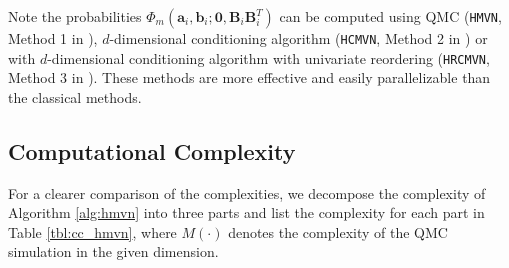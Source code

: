 Note the probabilities $\Phi_m(\mathbf{a}_i, \mathbf{b}_i; \mathbf{0}, \mathbf{B}_i\mathbf{B}_i^T)$ can be computed using QMC (\texttt{HMVN}, Method 1 in \citet{cao2019hierarchical}),  $d$-dimensional conditioning algorithm (\texttt{HCMVN}, Method 2 in \citet{cao2019hierarchical}) or with $d$-dimensional conditioning algorithm with univariate reordering (\texttt{HRCMVN}, Method 3 in \citet{cao2019hierarchical}). These methods are more effective and easily parallelizable than the classical methods.

\subsection{Computational Complexity}

For a clearer comparison of the complexities, we decompose the complexity of Algorithm \ref{alg:hmvn} into three parts and list the complexity for each part in Table \ref{tbl:cc_hmvn}, where $M(\cdot)$ denotes the complexity of the QMC simulation in the given dimension. 


